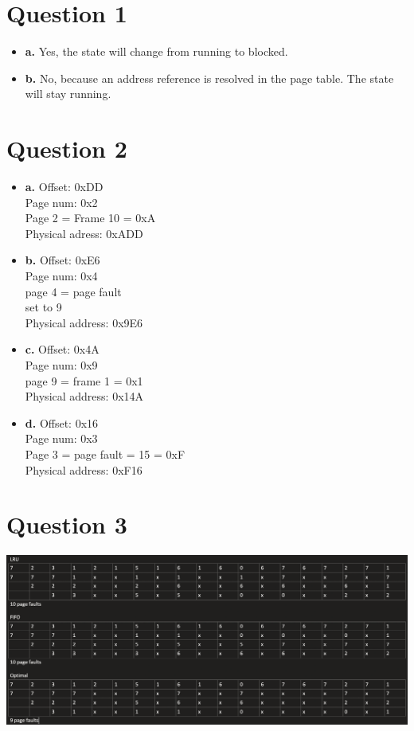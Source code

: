 \documentclass[11pt]{article}
\begin{document}
\maketitle

\section*{Question 1}
\begin{itemize}
    \item \textbf{a.}
        Yes, the state will change from running to blocked.
    \item \textbf{b.}
        No, because an address reference is resolved in the page table.
        The state will stay running.
\end{itemize}
\section*{Question 2}
\begin{itemize}
    \item \textbf{a.}
        Offset: 0xDD\\
        Page num: 0x2\\
        Page 2 = Frame 10 = 0xA\\
        Physical adress: 0xADD
    \item \textbf{b.}
        Offset: 0xE6\\
        Page num: 0x4\\
        page 4 = page fault\\
        set to 9\\
        Physical address: 0x9E6
    \item \textbf{c.}
        Offset: 0x4A\\
        Page num: 0x9\\
        page 9 = frame 1 = 0x1\\
        Physical address: 0x14A
    \item \textbf{d.}
        Offset: 0x16\\
        Page num: 0x3\\
        Page 3 = page fault = 15 = 0xF\\
        Physical address: 0xF16
\end{itemize}
\section*{Question 3}
\includegraphics[scale=0.4]{COMS352HW8Q3}\\
\end{document}
